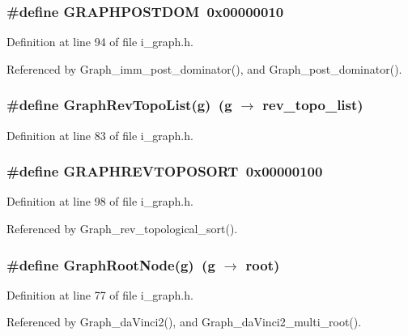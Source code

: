 \subsubsection{\setlength{\rightskip}{0pt plus 5cm}\#define GRAPHPOSTDOM~0x00000010}\label{i__graph_8h_4797b64a98893fa77b6fd9ff871f2647}




Definition at line 94 of file i\_\-graph.h.

Referenced by Graph\_\-imm\_\-post\_\-dominator(), and Graph\_\-post\_\-dominator().
\subsubsection{\setlength{\rightskip}{0pt plus 5cm}\#define Graph\-Rev\-Topo\-List(g)~(g $\rightarrow$ rev\_\-topo\_\-list)}\label{i__graph_8h_c4e59e6cc5d690cc1e22c9719efbd480}




Definition at line 83 of file i\_\-graph.h.
\subsubsection{\setlength{\rightskip}{0pt plus 5cm}\#define GRAPHREVTOPOSORT~0x00000100}\label{i__graph_8h_40c07b90a51f846dbf1499dae629acd0}




Definition at line 98 of file i\_\-graph.h.

Referenced by Graph\_\-rev\_\-topological\_\-sort().
\subsubsection{\setlength{\rightskip}{0pt plus 5cm}\#define Graph\-Root\-Node(g)~(g $\rightarrow$ root)}\label{i__graph_8h_906932868ab48ef427ded7ae38c7ada9}




Definition at line 77 of file i\_\-graph.h.

Referenced by Graph\_\-da\-Vinci2(), and Graph\_\-da\-Vinci2\_\-multi\_\-root().
